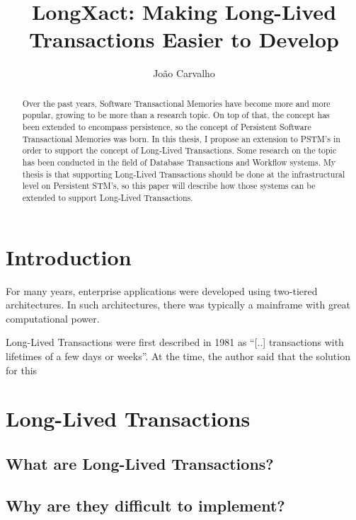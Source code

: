 \documentclass{llncs}
\begin{document}
\title{LongXact: Making Long-Lived Transactions Easier to Develop}

\author{João Carvalho}
\maketitle


\begin{abstract}
Over the past years, Software Transactional Memories have become more
and more popular, growing to be more than a research topic. On top of
that, the concept has been extended to encompass persistence, so
the concept of Persistent Software Transactional Memories was born. In
this thesis, I propose an extension to PSTM's in order to support the
concept of Long-Lived Transactions. Some research on the topic has
been conducted in the field of Database Transactions and Workflow
systems. My thesis is that supporting Long-Lived Transactions should
be done at the infrastructural level on Persistent STM's, so this
paper will describe how those systems can be extended to support
Long-Lived Transactions.
\end{abstract}


\section{Introduction}

For many years, enterprise applications were developed using
two-tiered architectures. In such architectures, there was typically a
mainframe with great computational power.

Long-Lived Transactions were first described in
1981 as ``[..] transactions with lifetimes of a few days or
weeks''\cite{gray1981transaction}. At the time, the author said that the
solution for this 

\section{Long-Lived Transactions}

\subsection{What are Long-Lived Transactions?}

\subsection{Why are they difficult to implement?}
\end{document}
